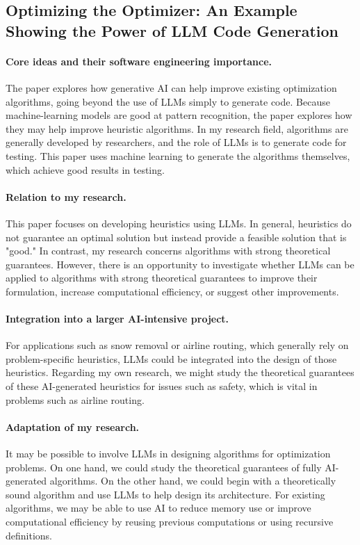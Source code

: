 \documentclass[12pt]{article}
\begin{document}
\subsection{Optimizing the Optimizer: An Example Showing
the Power of LLM Code Generation \cite{sartori2025optimizing}}
\paragraph{Core ideas and their software engineering importance.} The paper explores how generative AI can help improve existing optimization algorithms, going beyond the use of LLMs simply to generate code. Because machine-learning models are good at pattern recognition, the paper explores how they may help improve heuristic algorithms.
In my research field, algorithms are generally developed by researchers, and the role of LLMs is to generate code for testing. This paper uses machine learning to generate the algorithms themselves, which achieve good results in testing.
\paragraph{Relation to my research.} This paper focuses on developing heuristics using LLMs. In general, heuristics do not guarantee an optimal solution but instead provide a feasible solution that is "good." In contrast, my research concerns algorithms with strong theoretical guarantees.
However, there is an opportunity to investigate whether LLMs can be applied to algorithms with strong theoretical guarantees to improve their formulation, increase computational efficiency, or suggest other improvements.
\paragraph{Integration into a larger AI-intensive project.} For applications such as snow removal or airline routing, which generally rely on problem-specific heuristics, LLMs could be integrated into the design of those heuristics.
Regarding my own research, we might study the theoretical guarantees of these AI-generated heuristics for issues such as safety, which is vital in problems such as airline routing.
\paragraph{Adaptation of my research.} It may be possible to involve LLMs in designing algorithms for optimization problems. On one hand, we could study the theoretical guarantees of fully AI-generated algorithms. On the other hand, we could begin with a theoretically sound algorithm and use LLMs to help design its architecture.
For existing algorithms, we may be able to use AI to reduce memory use or improve computational efficiency by reusing previous computations or using recursive definitions.
\end{document}
